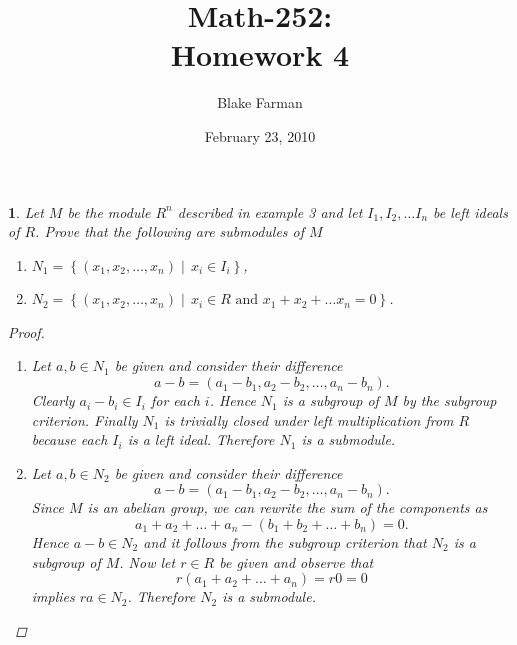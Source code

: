 \documentclass[10pt]{amsart}
\author{Blake Farman}
\title{Math-252:\\Homework 4}
\date{February 23, 2010}\pdfpagewidth 8.5in
\begin{document}
\maketitle

\newcommand{\Z}{\mathbb{Z}}
\newcommand{\R}{\mathbb{R}}
\newcommand{\Q}{\mathbb{Q}}
\newcommand{\C}{\mathbb{C}}

\renewcommand{\qedsymbol}{\(\blacksquare\)}
\newcommand{\znz}[1]{\Z / #1\Z}
\newcommand{\mznz}[1]{(\Z / #1\Z)^*}

\renewcommand{\phi}{\varphi}
\newenvironment{alphaenum}{
  \begin{enumerate}
    \renewcommand{\theenumi}{(\alph{enumi})}
    \renewcommand{\labelenumi}{\theenumi}
  }
  {\end{enumerate}}

\newcommand{\quadeq}[3]{\frac{-(#2) \pm \sqrt{(#2)^2 - 4(#1)(#3)}}{2(#3)}}
\newcommand{\F}{\mathbb{F}}
\newcommand{\tor}[1]{\operatorname{Tor}(#1)}
\newcommand{\real}[1]{\operatorname{Re}(#1)}
\newcommand{\imag}[1]{\operatorname{Im}(#1)}

\newtheorem{thm}{}

\begin{thm}
  \label{Ex1}
  Let $M$ be the module $R^n$ described in example 3 and let $I_1, I_2, \ldots I_n$ be left ideals of $R$.  
  Prove that the following are submodules of $M$
  \begin{alphaenum}
  \item
    $N_1 = \left\{(x_1,x_2,\ldots,x_n) \mid\,x_i \in I_i\right\}$,
  \item
    $N_2 = \left\{(x_1,x_2,\ldots,x_n) \mid\,x_i \in R \text{ and } x_1 + x_2 + \ldots x_n = 0\right\}$.
  \end{alphaenum}
  \begin{proof}
    \begin{alphaenum}
    \item
      Let $a,b \in N_1$ be given and consider their difference
      $$ a - b = (a_1 - b_1, a_2 - b_2, \ldots, a_n-b_n).$$
      Clearly $a_i - b_i \in I_i$ for each $i$.
      Hence $N_1$ is a subgroup of $M$ by the subgroup criterion.
      Finally $N_1$ is trivially closed under left multiplication from $R$ because each $I_i$ is a left ideal.
      Therefore $N_1$ is a submodule.
    \item
      Let $a,b \in N_2$ be given and consider their difference
      $$ a- b = (a_1 - b_1, a_2 - b_2, \ldots, a_n - b_n).$$
      Since $M$ is an abelian group, we can rewrite the sum of the components as 
      $$ a_1 + a_2 + \ldots + a_n - (b_1 + b_2 + \ldots + b_n) = 0.$$
      Hence $a-b \in N_2$ and it follows from the subgroup criterion that $N_2$ is a subgroup of $M$.
      Now let $r \in R$ be given and observe that 
      $$r(a_1 + a_2 + \ldots + a_n) = r0 = 0$$
      implies $ra \in N_2$.
      Therefore $N_2$ is a submodule.
    \end{alphaenum}
  \end{proof}
\end{thm}
\end{document}
